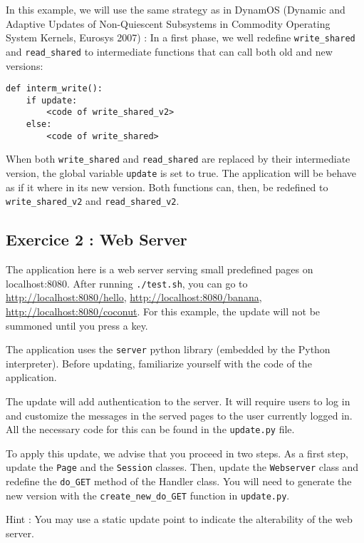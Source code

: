 \documentclass{article}
\begin{document}
In this example, we will use the same strategy as in DynamOS (Dynamic
and Adaptive Updates of Non-Quiescent Subsystems in Commodity
Operating System Kernels, Eurosys 2007) : In a first phase, we well
redefine \texttt{write\_shared} and \texttt{read\_shared} to
intermediate functions that can call both old and new versions:

\begin{verbatim}
def interm_write():
    if update:
        <code of write_shared_v2>
    else:
        <code of write_shared>
\end{verbatim}
 
When both \texttt{write\_shared} and \texttt{read\_shared} are
replaced by their intermediate version, the global variable
\texttt{update} is set to true. The application will be behave as if
it where in its new version. Both functions can, then, be redefined to
\texttt{write\_shared\_v2} and \texttt{read\_shared\_v2}.


\subsection{Exercice 2 : Web Server}

The application here is a web server serving small predefined pages on
localhost:8080. After running \texttt{./test.sh}, you can go to
\url{http://localhost:8080/hello}, \url{http://localhost:8080/banana},
\url{http://localhost:8080/coconut}. For this example, the update will
not be summoned until you press a key.

The application uses the \texttt{server} python library (embedded by
the Python interpreter). Before updating, familiarize yourself with
the code of the application.

The update will add authentication to the server. It will require
users to log in and customize the messages in the served pages to the
user currently logged in. All the necessary code for this can be found
in the \texttt{update.py} file.

To apply this update, we advise that you proceed in two steps. As a
first step, update the \texttt{Page} and the \texttt{Session}
classes. Then, update the \texttt{Webserver} class and redefine the
\texttt{do\_GET} method of the Handler class. You will need to generate
the new version with the \texttt{create\_new\_do\_GET} function in
\texttt{update.py}.

Hint : You may use a static update point to indicate the alterability
of the web server.
\end{document}
